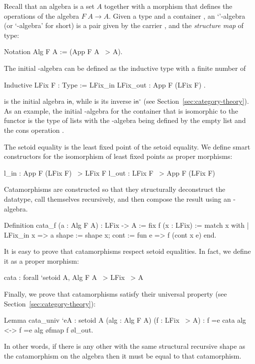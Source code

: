 \documentclass[a4paper,UKenglish,cleveref, autoref, thm-restate]{lipics-v2021}
\newcommand{\operator}[1]{\textsf{#1}}
\newcommand{\InOp}{\operator{in}^{\circ}}
\newcommand{\InIso}{\operator{in}}
\begin{document}
Recall that an algebra is a set $A$ together with a morphism that defines the
operations of the algebra $F\;A \to A$.  Given a type  and a container
, an `'-algebra (or `-algebra' for short) is a pair
given by the carrier , and the \emph{structure map} of type:
\begin{coqcode}
Notation Alg F A := (App F A ~> A).
\end{coqcode}
The initial -algebra can be defined as the inductive type with a finite
number of 
\begin{coqcode}
Inductive LFix F : Type := LFix_in { LFix_out : App F (LFix F) }.
\end{coqcode}
 is the initial algebra $\InIso$, while  is its
inverse $\InOp$ (see Section~\ref{sec:category-theory}).  As an example, the
initial -algebra for the container that is isomorphic to the functor
 is the type of lists with the -algebra being
defined by the empty list  and the cons operation
.

The  setoid equality is the least fixed point of the 
setoid equality. We define smart constructors for the isomorphism of least fixed
points as proper morphisms:
\begin{coqcode}
l_in : App F (LFix F) ~> LFix F         l_out : LFix F ~> App F (LFix F)
\end{coqcode}

Catamorphisms are constructed so that they structurally deconstruct the
datatype, call themselves recursively, and then compose the result using an
-algebra.
\begin{coqcode}
Definition cata_f (a : Alg F A) : LFix -> A
  := fix f (x : LFix) := match x with
        | LFix_in x => a {shape := shape x; cont := fun e => f (cont x e)}
        end.
\end{coqcode}
It is easy to prove that catamorphisms respect setoid equalities.  In fact, we
define it as a proper morphism:
\begin{coqcode}
cata : forall `{setoid A}, Alg F A ~> LFix ~> A
\end{coqcode}
Finally, we prove that catamorphisms satisfy their universal property (see
Section~\ref{sec:category-theory}):
\begin{coqcode}
Lemma cata_univ `{eA : setoid A} (alg : Alg F A) (f : LFix ~> A)
    : f =e cata alg <-> f =e alg \o fmap f \o l_out.
\end{coqcode}
In other words, if there is any other  with the same structural recursive
shape as the catamorphism on the algebra  then it must be equal to that
catamorphism.
\end{document}
